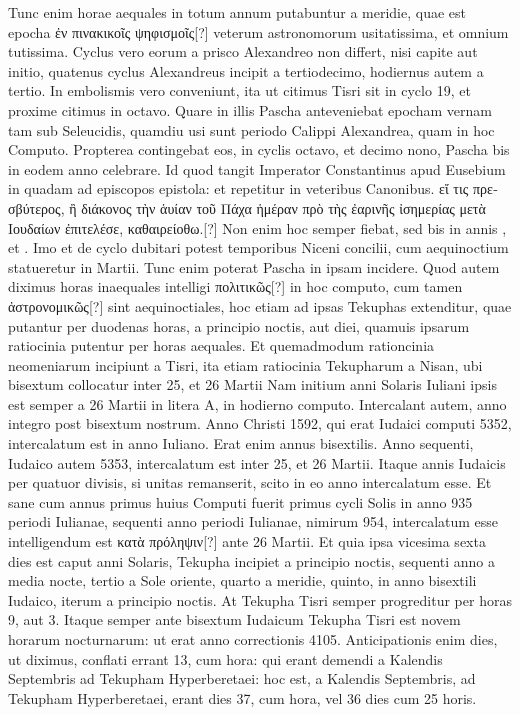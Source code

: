 Tunc enim horae aequales in totum annum putabuntur
a meridie, quae est epocha \textgreek{ἐν πινακικοῖς ψηφισμοῖς[?]}
 veterum astronomorum
usitatissima, et omnium tutissima.
Cyclus vero eorum
a prisco Alexandreo non differt, nisi capite aut initio, quatenus cyclus
Alexandreus incipit a tertiodecimo, hodiernus autem a tertio.
In embolismis vero conveniunt, ita ut citimus Tisri sit in cyclo 19, et
proxime citimus in octavo.
Quare in illis Pascha anteveniebat epocham
vernam tam sub Seleucidis, quamdiu usi sunt periodo Calippi
Alexandrea, quam in hoc Computo.
Propterea contingebat eos, in
cyclis octavo, et decimo nono, Pascha bis in eodem anno celebrare.
Id quod tangit Imperator Constantinus apud Eusebium in quadam
ad episcopos epistola: et repetitur in veteribus Canonibus.
\textgreek{εἴ τις πρεσβύτερος,
ἢ διάκονος τὴν ἁυίαν τοῦ Πάχα ἡμέραν πρὸ τὴς ἐαρινῆς ἰσημερίας μετὰ
Ιουδαίων ἐπιτελέσε, καθαιρείοθω.[?]}
Non enim hoc semper fiebat, sed bis in annis
, et .
Imo et de  cyclo dubitari potest temporibus Niceni
concilii, cum aequinoctium %
 statueretur in  Martii.
Tunc enim
poterat Pascha in ipsam  incidere.
Quod autem diximus horas
inaequales intelligi \textgreek{πολιτικῶς[?]} in hoc computo,
 cum tamen \textgreek{ἀστρονομικῶς[?]}
sint aequinoctiales, hoc etiam ad ipsas Tekuphas extenditur, quae
putantur per duodenas horas, a principio noctis, aut diei, quamuis
ipsarum ratiocinia putentur per horas aequales.
Et quemadmodum
rationcinia neomeniarum incipiunt a Tisri, ita etiam ratiocinia Tekupharum
a Nisan, ubi bisextum collocatur inter 25, et 26 Martii
Nam initium anni Solaris Iuliani ipsis est semper a 26 Martii
in litera \textsc{A}, in hodierno computo.
Intercalant autem, anno integro
post bisextum nostrum.
Anno Christi 1592, qui erat Iudaici computi
5352, intercalatum est in anno Iuliano.
Erat enim annus bisextilis.
Anno sequenti, Iudaico autem 5353, intercalatum est inter
25, et 26 Martii.
Itaque annis Iudaicis per quatuor divisis, si unitas remanserit,
scito in eo anno intercalatum esse.
Et sane cum annus primus huius
Computi fuerit primus cycli Solis in anno 935 periodi Iulianae, sequenti
anno periodi Iulianae, nimirum 954, intercalatum esse intelligendum
est \textgreek{κατὰ πρόληψιν[?]} ante 26 Martii.
Et quia ipsa vicesima sexta dies
est caput anni Solaris, Tekupha incipiet a principio noctis, sequenti anno
a media nocte, tertio a Sole oriente, quarto a meridie, quinto, in anno
bisextili Iudaico, iterum a principio noctis.
At Tekupha Tisri
semper progreditur per horas 9, aut 3.
Itaque semper ante bisextum
Iudaicum Tekupha Tisri est novem horarum nocturnarum: ut
erat anno correctionis 4105.
Anticipationis enim dies, ut diximus,
conflati errant 13, cum hora: qui erant demendi a Kalendis
Septembris ad Tekupham Hyperberetaei: hoc est, a Kalendis
Septembris, ad Tekupham Hyperberetaei, erant dies 37, cum
hora, vel 36 dies cum 25 horis.

